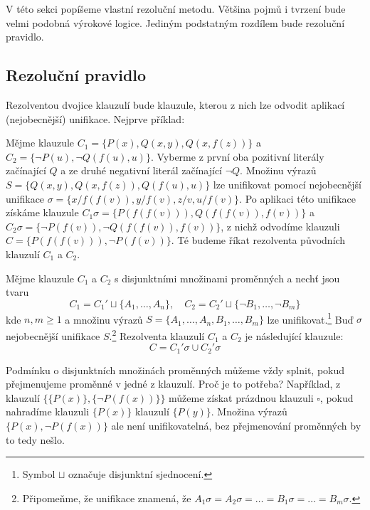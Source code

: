 V této sekci popíšeme vlastní rezoluční metodu. Většina pojmů i tvrzení bude velmi podobná výrokové logice. Jediným podstatným rozdílem bude \alert{rezoluční pravidlo}.


\subsection{Rezoluční pravidlo}

Rezolventou dvojice klauzulí bude klauzule, kterou z nich lze odvodit aplikací \alert{(nejobecnější) unifikace}. Nejprve příklad:

\begin{example}
Mějme klauzule $C_1=\{P(x),Q(x,y),Q(x,f(z))\}$ a $C_2=\{\neg P(u),\neg Q(f(u),u)\}$. Vyberme z první \alert{oba} pozitivní literály začínající $Q$ a ze druhé negativní literál začínající $\neg Q$. Množinu výrazů $S=\{Q(x,y),Q(x,f(z)),Q(f(u),u)\}$ lze unifikovat pomocí nejobecnější unifikace $\sigma=\{x/f(f(v)),y/f(v),z/v,u/f(v)\}$. Po aplikaci této unifikace získáme klauzule $C_1\sigma=\{P(f(f(v))),Q(f(f(v)),f(v))\}$ a $C_2\sigma=\{\neg P(f(v)),\neg Q(f(f(v)),f(v))\}$, z nichž odvodíme klauzuli $C=\{P(f(f(v))),\neg P(f(v))\}$. Té budeme říkat \alert{rezolventa} původních klauzulí $C_1$ a $C_2$.
\end{example}

\begin{definition}
    Mějme klauzule $C_1$ a $C_2$ s disjunktními množinami proměnných a nechť jsou tvaru
    $$
    C_1=C_1'\sqcup \{A_1,\dots,A_n\},\quad C_2=C_2'\sqcup \{\neg B_1,\dots,\neg B_m\}
    $$
    kde $n,m\ge 1$ a množinu výrazů $S=\{A_1,\dots,A_n,B_1,\dots,B_m\}$ lze unifikovat.\footnote{Symbol $\sqcup$ označuje \alert{disjunktní sjednocení}.} Buď $\sigma$ nejobecnější unifikace $S$.\footnote{Připomeňme, že unifikace znamená, že $A_1\sigma=A_2\sigma=\dots=B_1\sigma=\dots=B_m\sigma$.} \alert{Rezolventa} klauzulí $C_1$ a $C_2$ je následující klauzule:
    $$
    C=C_1'\sigma \cup C_2'\sigma
    $$
\end{definition}

\begin{remark}\label{remark:resolution-step-rename}
    Podmínku o disjunktních množinách proměnných můžeme vždy splnit, pokud přejmenujeme proměnné v jedné z klauzulí. Proč je to potřeba? Například, z klauzulí $\{\{P(x)\},\{\neg P(f(x))\}\}$ můžeme získat prázdnou klauzuli $\square$, pokud nahradíme klauzuli $\{P(x)\}$ klauzulí $\{P(y)\}$. Množina výrazů $\{P(x),\neg P(f(x))\}$ ale není unifikovatelná, bez přejmenování proměnných by to tedy nešlo.
\end{remark}


